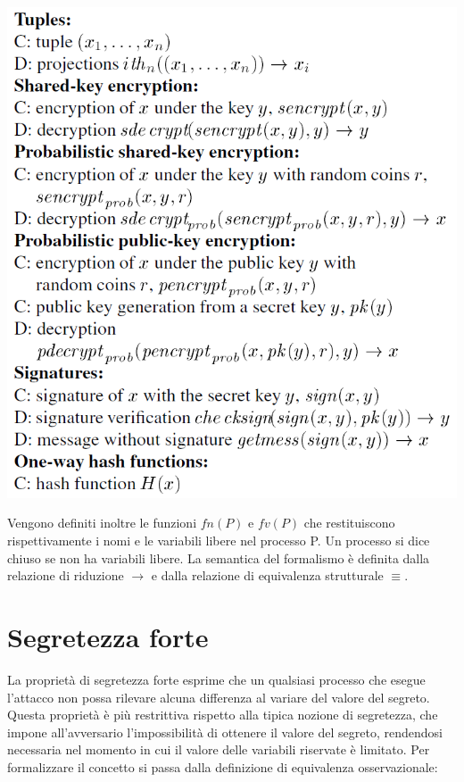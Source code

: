 \documentclass[12pt]{article}
\begin{document}
\begin{center}
 \includegraphics[scale=0.55]{Relazione/Immagini/crypto.PNG}
\end{center}
Vengono definiti inoltre le funzioni $fn(P)$ e $fv(P)$ che restituiscono rispettivamente i nomi e le variabili libere nel processo P. Un processo si dice chiuso se non ha variabili libere. La semantica del formalismo è definita dalla relazione di riduzione $ \xrightarrow{} $ e dalla relazione di equivalenza strutturale $ \equiv$.

\section*{Segretezza forte}
La proprietà di segretezza forte esprime che un qualsiasi processo che esegue l'attacco non possa rilevare alcuna differenza al variare del valore del segreto. Questa proprietà è più restrittiva rispetto alla tipica nozione di segretezza, che impone all'avversario l'impossibilità di ottenere il valore del segreto, rendendosi necessaria nel momento in cui il valore delle variabili riservate è limitato.
Per formalizzare il concetto si passa dalla definizione di equivalenza osservazionale:\\
\end{document}
